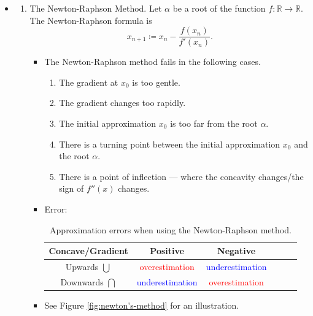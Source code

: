 \documentclass[../Notes.tex]{subfiles}
\begin{document}
\begin{stbox}{}
    \begin{itemize}
        \item[]
        \begin{enumerate}
            \item The Newton-Raphson Method. Let \(\alpha\) be a root of the function \(f\colon \mathbb{R}\to \mathbb{R}\). The Newton-Raphson formula is
            \[x_{n+1}\coloneq x_n-\frac{f(x_n)}{f'(x_n)}.\]
            \begin{itemize}
                \item The Newton-Raphson method fails in the following cases.
                \begin{enumerate}
                    \item The gradient at \(x_0\) is too gentle.
                    \item The gradient changes too rapidly.
                    \item The initial approximation \(x_0\) is too far from the root \(\alpha\).
                    \item There is a turning point between the initial approximation \(x_0\) and the root \(\alpha\).
                    \item There is a point of inflection --- where the concavity changes/the sign of \(f''(x)\) changes.
                \end{enumerate}
                \item Error: 
                \begin{table}[H]
                    \centering
                    \begin{tabular}{|Sc|Sc|Sc|}
                        \hline
                        Concave/Gradient & Positive & Negative\\
                        \hline
                        Upwards \(\bigcup\) & \textcolor{red}{overestimation} & \textcolor{blue}{underestimation}\\
                        \hline
                        Downwards \(\bigcap\) & \textcolor{blue}{underestimation} & \textcolor{red}{overestimation}\\
                        \hline
                    \end{tabular}
                    \caption{Approximation errors when using the Newton-Raphson method.}
                    \label{table:newton-raphson}
                \end{table}
                \item See Figure \ref{fig:newton's-method} for an illustration.
            \end{itemize}
        \end{enumerate}
    \end{itemize}
\end{stbox}
\end{document}
